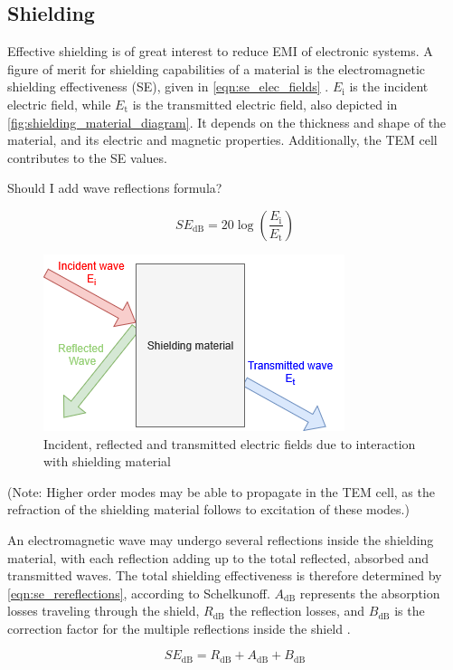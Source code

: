 \subsection{Shielding}

Effective shielding is of great interest to reduce EMI of electronic systems. A figure of merit for shielding capabilities of a material is the electromagnetic shielding effectiveness (SE), given in \autoref{eqn:se_elec_fields} \cite{10518640}. $E_\mathrm{i}$ is the incident electric field, while $E_\mathrm{t}$ is the transmitted electric field, also depicted in \autoref{fig:shielding_material_diagram}. It depends on the thickness and shape of the material, and its electric and magnetic properties. Additionally, the TEM cell contributes to the SE values.

Should I add wave reflections formula?

\begin{equation}
    SE_{\mathrm{dB}}=20\log{(\frac{E_\mathrm{i}}{E_\mathrm{t}})}
    \label{eqn:se_elec_fields}
\end{equation}

\begin{figure}[h]
    \centering
    \includegraphics[width=0.35\linewidth]{Documentation//images/shielding_material_diagram.png}
    \caption{Incident, reflected and transmitted electric fields due to interaction with shielding material}
    \label{fig:shielding_material_diagram}
\end{figure}

(Note: Higher order modes may be able to propagate in the TEM cell, as the refraction of the shielding material follows to excitation of these modes.)

An electromagnetic wave may undergo several reflections inside the shielding material, with each reflection adding up to the total reflected, absorbed and transmitted waves. The total shielding effectiveness is therefore determined by \autoref{eqn:se_rereflections}, according to Schelkunoff. $A_{\mathrm{dB}}$ represents the absorption losses traveling through the shield, $R_{\mathrm{dB}}$ the reflection losses, and $B_{\mathrm{dB}}$ is the correction factor for the multiple reflections inside the shield \cite{10518640}.

\begin{equation}
    SE_{\mathrm{dB}}=R_{\mathrm{dB}}+A_{\mathrm{dB}}+B_{\mathrm{dB}}
    \label{eqn:se_rereflections}
\end{equation}

